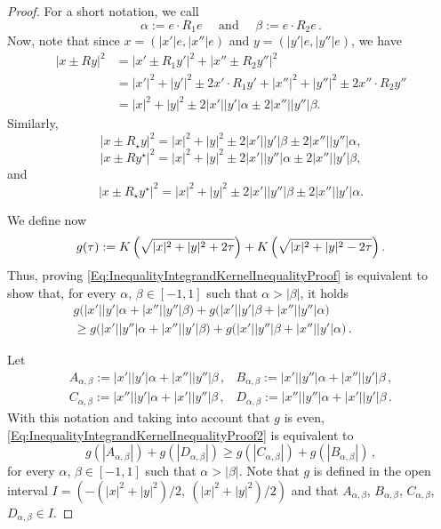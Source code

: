 \begin{proof}
For a short notation, we call
\begin{equation}
	\label{Eq:DefAlphaBeta}
	\alpha := e \cdot R_1 e  \quad \text{ and } \quad \beta := e \cdot R_2 e\,.
\end{equation}
Now, note that since  $x = (|x'|e, |x''|e)$ and $y = (|y'|e, |y''|e)$, we have
\begin{align*}
|x \pm Ry|^2&= |x' \pm R_1y'|^2 + |x'' \pm R_2y''|^2 \\
&= |x'|^2 + |y'|^2 \pm 2 x'\cdot R_1 y' +  |x''|^2 + |y''|^2 \pm 2 x''\cdot R_2 y''\\
&= |x|^2 + |y|^2 \pm 2 |x'||y'| \alpha \pm 2 |x''||y''| \beta.
\end{align*}
Similarly,
$$
|x \pm R_\star y|^2 =  |x|^2 + |y|^2 \pm 2 |x'||y'| \beta \pm 2 |x''||y''|\alpha,
$$
$$
|x \pm R y^\star|^2 =  |x|^2 + |y|^2 \pm 2 |x'||y''| \alpha \pm 2 |x''||y'|\beta,
$$
and
$$
|x \pm R_\star y^\star|^2 = |x|^2 + |y|^2 \pm 2 |x'||y''| \beta \pm 2 |x''||y'| \alpha.
$$

We define now
$$
g(\tau) := K \left ( {\sqrt{|x|^2 + |y|^2 + 2 \tau }}\right ) + K \left ( {\sqrt{|x|^2 + |y|^2 - 2 \tau}}\right ).
$$
Thus, proving \eqref{Eq:InequalityIntegrandKernelInequalityProof} is equivalent to show that, for every $\alpha$, $\beta \in [-1,1]$ such that $\alpha > |\beta|$, it holds
\begin{equation}
\label{Eq:InequalityIntegrandKernelInequalityProof2}
\begin{split}
g\Big(|x'||y'| \alpha + |x''||y''| \beta \Big)
+ g\Big(|x'||y'| \beta + |x''||y''| \alpha \Big) \hspace{2cm}
\\ \geq
g\Big(|x'||y''| \alpha + |x''||y'|\beta \Big)
+ g\Big(|x'||y''| \beta + |x''||y'| \alpha \Big)\,.
\end{split}
\end{equation}

Let
$$
\begin{array}{cc}
A_{\alpha,\beta} := |x'||y'|  \alpha + |x''||y''|\beta \,, &
B_{\alpha,\beta} := |x'||y''| \alpha + |x''||y'| \beta \,, \\
C_{\alpha,\beta} := |x''||y'| \alpha + |x'||y''| \beta \,, &
D_{\alpha,\beta} := |x''||y''|\alpha + |x'||y'|  \beta \,.
\end{array}
$$
With this notation and taking into account that $g$ is even,
\eqref{Eq:InequalityIntegrandKernelInequalityProof2} is equivalent to
\begin{equation}
\label{Eq:InequalityIntegrandKernelInequalityProof3}
g(|A_{\alpha,\beta}|) + g(|D_{\alpha,\beta}|) \geq g(|C_{\alpha,\beta}|) + g(|B_{\alpha,\beta}|)\,,
\end{equation}
for every $\alpha$, $\beta \in [-1,1]$ such that $\alpha > |\beta|$. Note that $g$ is defined in the open interval $I = (-(|x|^2 + |y|^2)/2,\ (|x|^2 + |y|^2)/2)$ and that $A_{\alpha,\beta}$, $B_{\alpha,\beta}$, $C_{\alpha,\beta}$, $D_{\alpha,\beta} \in I$.


\end{proof}
